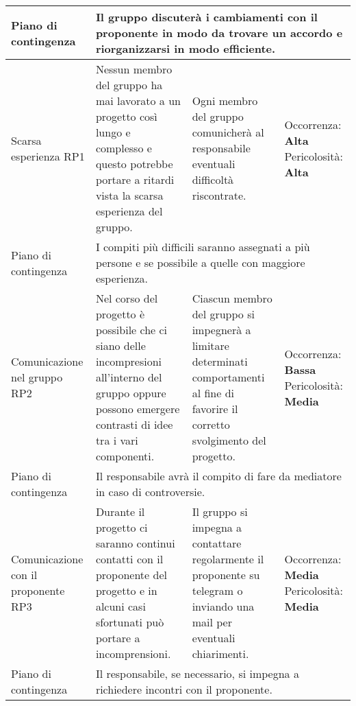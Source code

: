 \begin{center}
\begin{longtable}{|p{}|p{}|p{}|p{}|}
		\hline
		\centering Piano di contingenza & \multicolumn{3}{p{0.84\textwidth}}{Il gruppo discuterà i cambiamenti con il proponente in modo da trovare un accordo e riorganizzarsi in modo efficiente.} \\
		\hline
		\centering Scarsa esperienza RP1& Nessun membro del gruppo ha mai lavorato a un progetto così lungo e complesso e questo potrebbe portare a ritardi vista la scarsa esperienza del gruppo. & Ogni membro del gruppo comunicherà al responsabile eventuali difficoltà riscontrate. & Occorrenza: \textbf{Alta} Pericolosità: \textbf{Alta} \\
		\hline
		\centering Piano di contingenza & \multicolumn{3}{p{0.84\textwidth}}{I compiti più difficili saranno assegnati a più persone e se possibile a quelle con maggiore esperienza.} \\
		\hline
		\centering Comunicazione nel gruppo RP2& Nel corso del progetto è possibile che ci siano delle incompresioni all'interno del gruppo oppure possono emergere contrasti di idee tra i vari componenti. &Ciascun membro del gruppo si impegnerà a limitare determinati comportamenti al fine di favorire il corretto svolgimento del progetto. & Occorrenza: \textbf{Bassa} Pericolosità: \textbf{Media} \\
		\hline
		\centering Piano di contingenza & \multicolumn{3}{p{0.84\textwidth}}{Il responsabile avrà il compito di fare da mediatore in caso di controversie.} \\
		\hline
		\centering Comunicazione con il proponente RP3& Durante il progetto ci saranno continui contatti con il proponente del progetto e in alcuni casi sfortunati può portare a incomprensioni.& Il gruppo si impegna a contattare regolarmente il proponente su telegram o inviando una mail per eventuali chiarimenti. & Occorrenza: \textbf{Media} Pericolosità: \textbf{Media} \\
		\hline
		\centering Piano di contingenza & \multicolumn{3}{p{0.84\textwidth}}{Il responsabile, se necessario, si impegna a richiedere incontri con il proponente.} \\
		\hline			
	\end{longtable}
\end{center}
